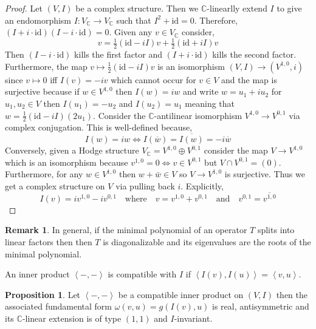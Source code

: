 \documentclass[12pt]{extarticle}
\newcommand{\C}{\mathbb{C}}
\newcommand{\id}{\mathrm{id}}
\theoremstyle{definition}
\newtheorem{proposition}[theorem]{Proposition}
\newtheorem{remark}{Remark}
\newenvironment{definition}[1][Definition:]{\begin{trivlist}
\item[\hskip \labelsep {\bfseries #1}]}{\end{trivlist}}
\begin{document}
\begin{proof}
Let $(V, I)$ be a complex structure. Then we $\C$-linearlly extend $I$ to give an endomorphism $I : V_\C \to V_\C$ such that $I^2 + \id = 0$. Therefore, $(I + i \cdot \id)(I - i \cdot \id) = 0$. Given any $v \in V_\C$ consider,
\[ v = \tfrac{1}{2} (\id - i I) v + \tfrac{1}{2} (\id + i I) v \]
Then $(I - i \cdot \id)$ kills the first factor and $(I + i \cdot \id)$ kills the second factor. Furthermore, the map $v \mapsto \tfrac{1}{2} (\id - i I)v$ is an isomorphism $(V, I) \to (V^{1,0}, i)$ since $v \mapsto 0$ iff $I(v) = - i v$ which cannot occur for $v \in V$ and the map is surjective because if $w \in V^{1,0}$ then $I(w) = i w$ and write $w = u_1 + i u_2$ for $u_1, u_2 \in V$ then $I(u_1) = - u_2$ and $I(u_2) = u_1$ meaning that $w = \tfrac{1}{2} (\id - i I) (2u_1)$. Consider the $\C$-antilinear isomorphism $V^{1,0} \to V^{0,1}$ via complex conjugation. This is well-defined because,
\[ I(w) = i w \iff I(\overline{w}) = \overline{I(w)} = - i \overline{w} \]
Conversely, given a Hodge structure $V_\C = V^{1,0} \oplus V^{0,1}$ consider the map $V \to V^{1,0}$ which is an isomorphism because $v^{1,0} = 0 \iff v \in V^{0,1}$ but $V \cap V^{0,1} = (0)$.  
Furthermore, for any $w \in V^{1,0}$ then $w + \bar{w} \in V$ so $V \to V^{1,0}$ is surjective. Thus we get a complex structure on $V$ via pulling back $i$. Explicitly, 
\[ I(v) = i v^{1,0} - i v^{0,1} \quad \text{where} \quad v = v^{1,0} + v^{0,1} \quad \text{and} \quad v^{0,1} = \overline{v^{1,0}} \]
\end{proof}

\begin{remark}
In general, if the minimal polynomial of an operator $T$ splits into linear factors then then $T$ is diagonalizable and its eigenvalues are the roots of the minimal polynomial.
\end{remark}

\newcommand{\inner}[2]{\left< #1, #2 \right>}
\renewcommand{\Re}[1]{\mathrm{Re}\left( #1 \right)}

\begin{definition}
An inner product $\inner{-}{-}$ is compatible with $I$ if $\inner{I(v)}{I(u)} = \inner{v}{u}$.
\end{definition}

\begin{proposition}
Let $\inner{-}{-}$ be a compatible inner product on $(V, I)$ then the associated fundamental form $\omega(v,u) = g(I(v), u)$ is real, antisymmetric and its $\C$-linear extension is of type $(1,1)$ and $I$-invariant.
\end{proposition}
\end{document}

